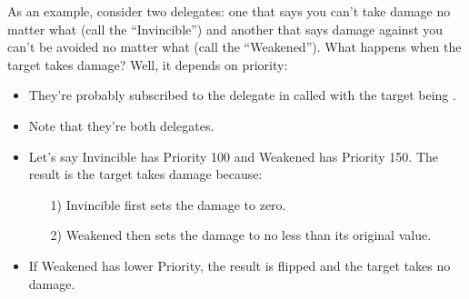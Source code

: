 \begin{enumerate}
{\begin{itemize}
{\begin{tcolorbox}[colback=gray!20!white,colframe=blue!75!black,title=Priorities]
			As an example, consider two delegates: one that says you can't take damage no matter what (call the  ``Invincible'') and another that says damage against you can't be avoided no matter what (call the  ``Weakened''). What happens when the target takes damage? Well, it depends on priority:
			\begin{itemize}
				\item{They're probably subscribed to the  delegate in  called  with the target  being .}
				\item{Note that they're both  delegates.}
				\item{Let's say Invincible has Priority 100 and Weakened has Priority 150. The result is the target takes damage because:
					\begin{enumerate}
						\item[1)]{Invincible first sets the damage to zero.}
						\item[2)]{Weakened then sets the damage to no less than its original value.}
					\end{enumerate}
				}
				\item{If Weakened has lower Priority, the result is flipped and the target takes no damage.}
			\end{itemize}
	 

\end{tcolorbox}}
\end{itemize}}
\end{enumerate}
